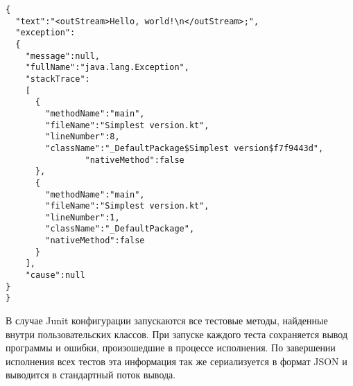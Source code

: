 \begin{lstlisting}[caption=Пример вывода программы в случае JVM конфигурации, label=lst:output_example]
{
  "text":"<outStream>Hello, world!\n</outStream>;",
  "exception":		
  {
    "message":null,
    "fullName":"java.lang.Exception",
    "stackTrace":
    [
      {
        "methodName":"main",
        "fileName":"Simplest version.kt",
        "lineNumber":8,
        "className":"_DefaultPackage$Simplest version$f7f9443d",
	 			"nativeMethod":false
      },
      {
        "methodName":"main",
        "fileName":"Simplest version.kt",
        "lineNumber":1,
        "className":"_DefaultPackage",
        "nativeMethod":false
      }
    ],
    "cause":null
}
}
\end{lstlisting}
	
	В случае Junit конфигурации запускаются все тестовые методы, найденные внутри пользовательских классов. При запуске каждого теста сохраняется вывод программы и ошибки, произошедшие в процессе исполнения. По завершении исполнения всех тестов эта информация так же сериализуется в формат JSON и выводится в стандартный поток вывода.
	

	
	
	